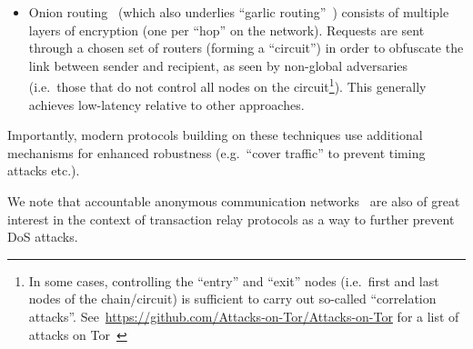\begin{itemize}
    \item Onion routing~\cite{DBLP:journals/cacm/GoldschlagRS99} (which also underlies ``garlic routing''~\cite{garlic-nets}) consists of multiple layers of encryption (one per ``hop'' on the network). Requests are sent through a chosen set of routers (forming a ``circuit'') in order to obfuscate the link between sender and recipient, as seen by non-global adversaries (i.e.~those that do not control all nodes on the circuit\footnote{In some cases, controlling the ``entry'' and ``exit'' nodes (i.e.~first and last nodes of the chain/circuit) is sufficient to carry out so-called ``correlation attacks''. See~\url{https://github.com/Attacks-on-Tor/Attacks-on-Tor} for a list of attacks on Tor~\cite{DBLP:conf/uss/DingledineMS04}}). This generally achieves low-latency relative to other approaches.
\end{itemize}

Importantly, modern protocols building on these techniques use additional mechanisms for enhanced robustness (e.g.~``cover traffic'' to prevent timing attacks etc.).

\begin{remark}
    We note that accountable anonymous communication networks~\cite{DBLP:books/sp/07/DiazP07} are also of great interest in the context of transaction relay protocols as a way to further prevent DoS attacks.
\end{remark}
